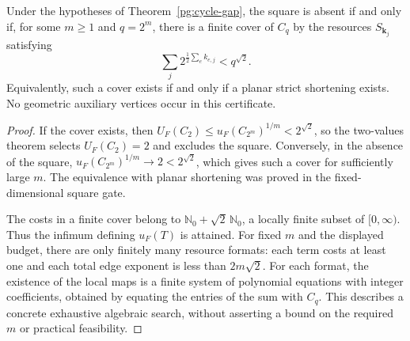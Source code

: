 \begin{corollary}
\label{pg:cycle-finite}
Under the hypotheses of Theorem~\ref{pg:cycle-gap}, the square is
absent if and only if, for some $m\geq1$ and $q=2^m$, there is a
finite cover of $C_q$ by the resources $S_{\mathbf k_j}$ satisfying
\[
 \sum_j2^{\frac12\sum_e k_{e,j}}<q^{\sqrt2}.
 \tag{PG-CYCLE-finite}
\]
Equivalently, such a cover exists if and only if a planar strict
shortening exists. No geometric auxiliary vertices occur in this
certificate.
\end{corollary}
\begin{proof}
If the cover exists, then
$U_F(C_2)\leq u_F(C_{2^m})^{1/m}<2^{\sqrt2}$, so the
two-values theorem selects $U_F(C_2)=2$ and excludes the square.
Conversely, in the absence of the square,
$u_F(C_{2^m})^{1/m}\to2<2^{\sqrt2}$, which gives such a cover
for sufficiently large $m$. The equivalence with planar shortening
was proved in the fixed-dimensional square gate.

The costs in a finite cover belong to
$\mathbb N_0+\sqrt2\,\mathbb N_0$, a locally finite subset of
$[0,\infty)$. Thus the infimum defining $u_F(T)$ is attained.
For fixed $m$ and the displayed budget, there are only finitely
many resource formats: each term costs at least one and each
total edge exponent is less than $2m\sqrt2$.
For each format, the existence of the local maps is a finite
system of polynomial equations with integer coefficients,
obtained by equating the entries of the sum with $C_q$.
This describes a concrete exhaustive algebraic search, without
asserting a bound on the required $m$ or practical feasibility.
\end{proof}

